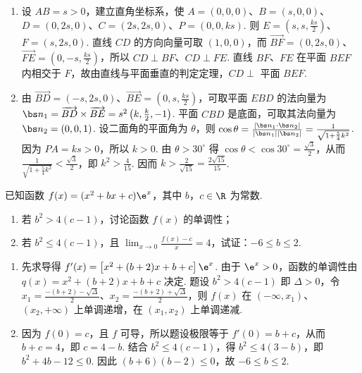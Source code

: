 \begin{solution}
\begin{enumerate}
\item 设 \(AB=s>0\)，建立直角坐标系，使 \(A=(0,0,0)\)、\(B=(s,0,0)\)、\(D=(0,2s,0)\)、\(C=(2s,2s,0)\)、\(P=(0,0,ks)\). 则 \(E=(s,s,\frac{ks}{2})\)、\(F=(s,2s,0)\). 直线 \(CD\) 的方向向量可取 \((1,0,0)\)，而 \(\overrightarrow{BF}=(0,2s,0)\)、\(\overrightarrow{FE}=(0,-s,\frac{ks}{2})\)，所以 \(CD\perp BF\)、\(CD\perp FE\). 直线 \(BF\)、\(FE\) 在平面 \(BEF\) 内相交于 \(F\)，故由直线与平面垂直的判定定理，\(CD\perp\) 平面 \(BEF\).
\item 由 \(\overrightarrow{BD}=(-s,2s,0)\)、\(\overrightarrow{BE}=(0,s,\frac{ks}{2})\)，可取平面 \(EBD\) 的法向量为 \(\bs n_1=\overrightarrow{BD}\times\overrightarrow{BE}=s^{2}\left(k,\frac{k}{2},-1\right)\). 平面 \(CBD\) 是底面，可取其法向量为 \(\bs n_2=(0,0,1)\). 设二面角的平面角为 \(\theta\)，则 \(\cos\theta=\frac{|\bs n_1\cdot\bs n_2|}{|\bs n_1||\bs n_2|}=\frac{1}{\sqrt{1+\frac54k^{2}}}\). 因为 \(PA=ks>0\)，所以 \(k>0\). 由 \(\theta>30^{\circ}\) 得 \(\cos\theta<\cos30^{\circ}=\frac{\sqrt3}{2}\)，从而 \(\frac{1}{\sqrt{1+\frac54k^{2}}}<\frac{\sqrt3}{2}\)，即 \(k^{2}>\frac4{15}\). 因而 \(k>\frac2{\sqrt{15}}=\frac{2\sqrt{15}}{15}\).
\end{enumerate}
\end{solution}

\begin{problem}
已知函数 \(f(x) = (x^{2} + bx + c)\e^{x}\)，其中 \(b\)，\(c \in \R\) 为常数.
\begin{enumerate}
\item 若 \(b^{2} > 4(c - 1)\)，讨论函数 \(f(x)\) 的单调性；
\item 若 \(b^{2} \leqslant 4(c - 1)\)，且 \(\displaystyle\lim_{x\to0}\frac{f(x) - c}{x} = 4\)，试证：\(-6 \leqslant b \leqslant 2\).
\end{enumerate}
\end{problem}

\begin{solution}
\begin{enumerate}
\item 先求导得 \(f'(x)=\left[x^{2}+(b+2)x+b+c\right]\e^{x}\). 由于 \(\e^{x}>0\)，函数的单调性由 \(q(x)=x^{2}+(b+2)x+b+c\) 决定. 题设 \(b^{2}>4(c-1)\) 即 \(\Delta>0\)，令 \(x_{1}=\frac{-(b+2)-\sqrt{\Delta}}{2}\)、\(x_{2}=\frac{-(b+2)+\sqrt{\Delta}}{2}\)，则 \(f(x)\) 在 \((-\infty,x_{1})\)、\((x_{2},+\infty)\) 上单调递增，在 \((x_{1},x_{2})\) 上单调递减.
\item 因为 \(f(0)=c\)，且 \(f\) 可导，所以题设极限等于 \(f'(0)=b+c\)，从而 \(b+c=4\)，即 \(c=4-b\). 结合 \(b^{2}\leqslant4(c-1)\)，得 \(b^{2}\leqslant4(3-b)\)，即 \(b^{2}+4b-12\leqslant0\). 因此 \((b+6)(b-2)\leqslant0\)，故 \(-6\leqslant b\leqslant2\).
\end{enumerate}
\end{solution}

